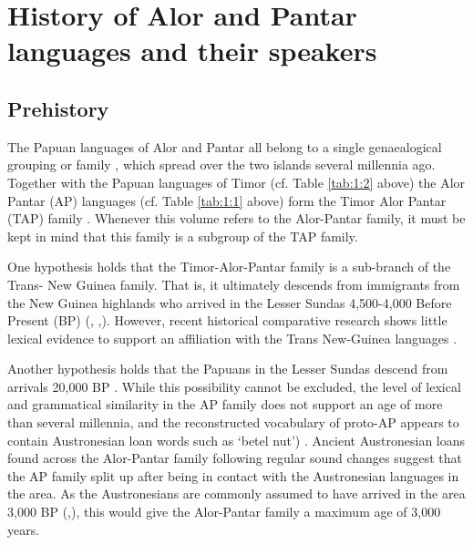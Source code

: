 \section{History of Alor and Pantar languages and their speakers}\label{sec:1:4}

\subsection{Prehistory}\label{sec:1:4.1}
The Papuan languages of Alor and Pantar all belong to a single genaealogical grouping or family \citep{HoltonEtAl2012,HoltonRobinsonTVhistory}, which spread over the two islands several millennia ago. Together with the Papuan languages of Timor (cf. Table \ref{tab:1:2} above) the Alor Pantar (AP) languages (cf. Table \ref{tab:1:1} above) form the Timor Alor Pantar (TAP) family \citep{SchapperEtAlTVtimor}. Whenever this volume refers to the Alor-Pantar family, it must be kept in mind that this family is a subgroup of the TAP family. 

One hypothesis holds that the Timor-Alor-Pantar family is a sub-branch of the Trans- New Guinea family. That is, it ultimately descends from immigrants from the New Guinea highlands who arrived in the Lesser Sundas 4,500-4,000 Before Present (BP) (\citealt[123]{Bellwood1997}, \citealt[42]{Ross2005},\citealt{Pawley2005}). However, recent historical comparative research \citep{RobinsonEtAl2012internal,HoltonRobinsonTVposition} shows little lexical evidence to support an affiliation with the Trans New-Guinea languages \citep[cf.][]{WurmEtAl1975,Ross2005}.

Another hypothesis holds that the Papuans in the Lesser Sundas descend from arrivals 20,000 BP \citep{Summerhayes2007}. While this possibility cannot be excluded, the level of lexical and grammatical similarity in the AP family does not support an age of more than several millennia, and the reconstructed vocabulary of proto-AP appears to contain Austronesian loan words such as  `betel nut') \citep{HoltonEtAl2012,Robinsontaalorpantar}. Ancient Austronesian loans found across the Alor-Pantar family following regular sound changes suggest that the AP family split up after being in contact with the Austronesian languages in the area. As the Austronesians are commonly assumed to have arrived in the area {\Tilde}3,000 BP (\citealt[100]{Pawley2005},\citealt{Spriggs2011}), this would give the Alor-Pantar family a maximum age of {\Tilde}3,000 years.

